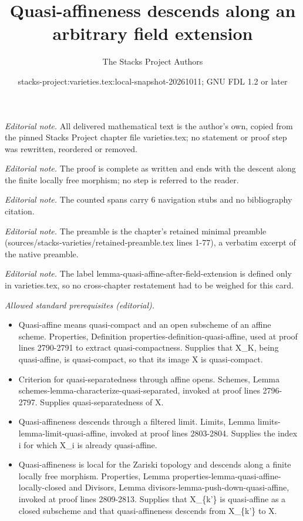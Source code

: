 \documentclass[10pt,a4paper]{amsart}
\title{Quasi-affineness descends along an arbitrary field extension}
\author{The Stacks Project Authors}
\date{stacks-project:varieties.tex:local-snapshot-20261011; GNU FDL 1.2 or later}
\theoremstyle{plain}
\theoremstyle{definition}
\theoremstyle{remark}
\numberwithin{equation}{subsection}
\begin{document}
\maketitle
\noindent\textit{Editorial note.} All delivered mathematical text is the author's own, copied from the pinned Stacks Project chapter file varieties.tex; no statement or proof step was rewritten, reordered or removed.\par\medskip
\noindent\textit{Editorial note.} The proof is complete as written and ends with the descent along the finite locally free morphism; no step is referred to the reader.\par\medskip
\noindent\textit{Editorial note.} The counted spans carry 6 navigation stubs and no bibliography citation.\par\medskip
\noindent\textit{Editorial note.} The preamble is the chapter's retained minimal preamble (sources/stacks-varieties/retained-preamble.tex lines 1-77), a verbatim excerpt of the native preamble.\par\medskip
\noindent\textit{Editorial note.} The label lemma-quasi-affine-after-field-extension is defined only in varieties.tex, so no cross-chapter restatement had to be weighed for this card.\par\medskip
\noindent\textit{Allowed standard prerequisites (editorial).}\begin{itemize}
\item Quasi-affine means quasi-compact and an open subscheme of an affine scheme. Properties, Definition properties-definition-quasi-affine, used at proof lines 2790-2791 to extract quasi-compactness. Supplies that X\_K, being quasi-affine, is quasi-compact, so that its image X is quasi-compact.
\item Criterion for quasi-separatedness through affine opens. Schemes, Lemma schemes-lemma-characterize-quasi-separated, invoked at proof lines 2796-2797. Supplies quasi-separatedness of X.
\item Quasi-affineness descends through a filtered limit. Limits, Lemma limits-lemma-limit-quasi-affine, invoked at proof lines 2803-2804. Supplies the index i for which X\_i is already quasi-affine.
\item Quasi-affineness is local for the Zariski topology and descends along a finite locally free morphism. Properties, Lemma properties-lemma-quasi-affine-locally-closed and Divisors, Lemma divisors-lemma-push-down-quasi-affine, invoked at proof lines 2809-2813. Supplies that X\_\{k'\} is quasi-affine as a closed subscheme and that quasi-affineness descends from X\_\{k'\} to X.
\end{itemize}\medskip
\end{document}
